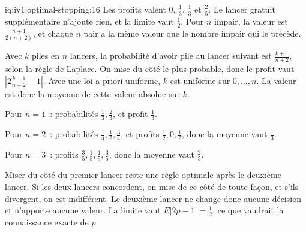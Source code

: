 \begin{solution}{iq:iv1:optimal-stopping:16}
Les profits valent 0, $\tfrac13$, $\tfrac13$ et $\tfrac25$. Le lancer gratuit supplémentaire n'ajoute rien, et la limite vaut $\tfrac12$. Pour $n$ impair, la valeur est $\frac{n + 1}{2(n + 2)}$, et chaque $n$ pair a la même valeur que le nombre impair qui le précède.

Avec $k$ piles en $n$ lancers, la probabilité d'avoir pile au lancer suivant est $\frac{k + 1}{n + 2}$, selon la règle de Laplace. On mise du côté le plus probable, donc le profit vaut $|2\frac{k + 1}{n + 2} - 1|$. Avec une loi a priori uniforme, $k$ est uniforme sur $0, \dots, n$. La valeur est donc la moyenne de cette valeur absolue sur $k$.

Pour $n = 1$~: probabilités $\tfrac13, \tfrac23$, et profit $\tfrac13$.

Pour $n = 2$~: probabilités $\tfrac14, \tfrac12, \tfrac34$, et profits $\tfrac12, 0, \tfrac12$, donc la moyenne vaut $\tfrac13$.

Pour $n = 3$~: profits $\tfrac35, \tfrac15, \tfrac15, \tfrac35$, donc la moyenne vaut $\tfrac25$.

Miser du côté du premier lancer reste une règle optimale après le deuxième lancer. Si les deux lancers concordent, on mise de ce côté de toute façon, et s'ils divergent, on est indifférent. Le deuxième lancer ne change donc aucune décision et n'apporte aucune valeur. La limite vaut $E|2p - 1| = \tfrac12$, ce que vaudrait la connaissance exacte de $p$.

\end{solution}

